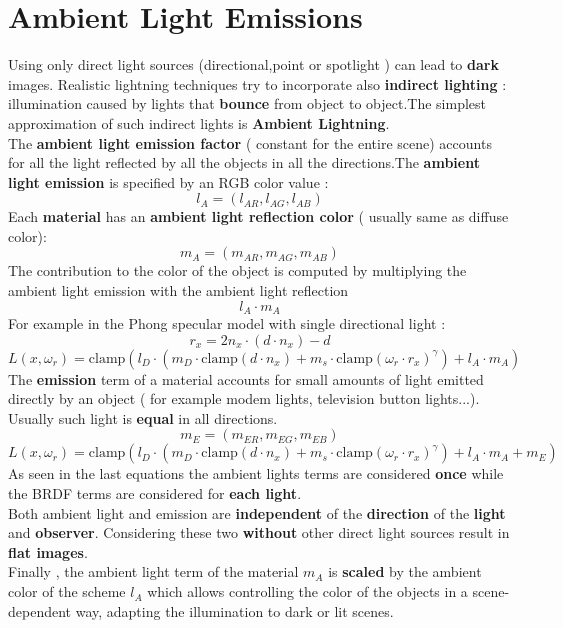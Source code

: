 \newpage
\section{Ambient Light Emissions}
Using only direct light sources (directional,point or spotlight ) can lead to \textbf{dark} images. Realistic lightning techniques try to incorporate also \textbf{indirect lighting} : illumination caused by lights that \textbf{bounce} from object to object.The simplest approximation of such indirect lights is \textbf{Ambient Lightning}.\\
The \textbf{ambient light emission factor} ( constant for the entire scene) accounts for all the light reflected by all the objects in all the directions.The \textbf{ambient light emission} is specified by an RGB color value : $$ l_A= (l_{AR},l_{AG}, l_{AB}) $$
Each \textbf{material} has an \textbf{ambient light reflection color} ( usually same as diffuse color):
$$ m_A= (m_{AR},m_{AG}, m_{AB}) $$
The contribution to the color of the object is computed by multiplying the ambient light emission with the ambient light reflection $$ l_A \cdot m_A$$
For example in the Phong specular model with single directional light :
$$ r_x=2n_x \cdot ( d \cdot n_x)-d$$
$$ L(x,\omega_r) = \text{clamp}(l_D \cdot (m_D \cdot \text{clamp}(d \cdot n_x)+m_s \cdot \text{clamp}(\omega_r \cdot r_x)^{\gamma})+ l_A \cdot m_A)$$
The \textbf{emission} term of a material accounts for small amounts of light emitted directly by an object ( for example modem lights, television button lights...). Usually such light is \textbf{equal} in all directions.  
$$ m_E= (m_{ER},m_{EG}, m_{EB}) $$ 
$$ L(x,\omega_r) = \text{clamp}(l_D \cdot (m_D \cdot \text{clamp}(d \cdot n_x)+m_s \cdot \text{clamp}(\omega_r \cdot r_x)^{\gamma})+ l_A \cdot m_A + m_E)$$
As seen in the last equations the ambient lights terms are considered \textbf{once} while the BRDF terms are considered for \textbf{each light}.\\
Both ambient light and emission are \textbf{independent} of the \textbf{direction} of the \textbf{light} and \textbf{observer}. Considering these two \textbf{without} other direct light sources result in \textbf{flat images}.\\
Finally , the ambient light term of the material $m_A$ is \textbf{scaled} by the ambient color of the scheme $l_A$ which allows controlling the color of the objects in a scene-dependent way, adapting the illumination to dark or lit scenes.